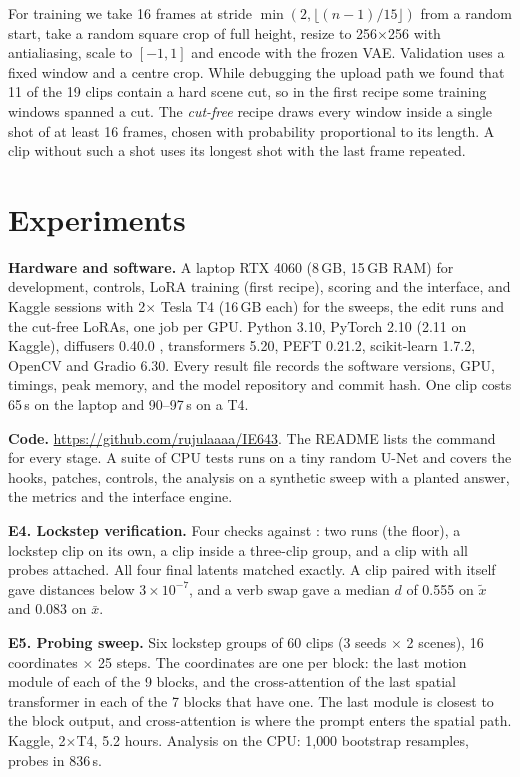 \documentclass[twoside,english]{article}
\newcommand{\xs}{\bar{x}}         %
\newcommand{\xd}{\tilde{x}}       %
\begin{document}
For training we take 16 frames at stride $\min(2, \lfloor (n-1)/15 \rfloor)$ from a random start, take a
random square crop of full height, resize to 256$\times$256 with antialiasing, scale to $[-1,1]$ and encode
with the frozen VAE. Validation uses a fixed window and a centre crop. While debugging the upload path we
found that 11 of the 19 clips contain a hard scene cut, so in the first recipe some training windows
spanned a cut. The \emph{cut-free} recipe draws every window inside a single shot of at least 16 frames,
chosen with probability proportional to its length. A clip without such a shot uses its longest shot with
the last frame repeated.

\section{Experiments} \label{sec:exp}

\textbf{Hardware and software.} A laptop RTX 4060 (8\,GB, 15\,GB RAM) for development, controls, LoRA
training (first recipe), scoring and the interface, and Kaggle sessions with 2$\times$ Tesla T4 (16\,GB
each) for the sweeps, the edit runs and the cut-free LoRAs, one job per GPU. Python 3.10, PyTorch 2.10
(2.11 on Kaggle), diffusers 0.40.0 \citep{hf_diffusers}, transformers 5.20, PEFT 0.21.2, scikit-learn
1.7.2, OpenCV and Gradio 6.30. Every result file records the software versions, GPU, timings, peak
memory, and the model repository and commit hash. One clip costs 65\,s on the laptop and 90--97\,s on a T4.

\textbf{Code.} \url{https://github.com/rujulaaaa/IE643}. The README lists the command for every stage. A
suite of CPU tests runs on a tiny random U-Net and covers the hooks, patches, controls, the analysis on a
synthetic sweep with a planted answer, the metrics and the interface engine.

\textbf{E4. Lockstep verification.} Four checks against : two  runs (the floor),
a lockstep clip on its own, a clip inside a three-clip group, and a clip with all probes attached. All
four final latents matched exactly. A clip paired with itself gave distances below $3\times10^{-7}$,
and a verb swap gave a median $d$ of 0.555 on $\xd$ and 0.083 on $\xs$.

\textbf{E5. Probing sweep.} Six lockstep groups of 60 clips (3 seeds $\times$ 2 scenes), 16 coordinates
$\times$ 25 steps. The coordinates are one per block: the last motion module of each of the 9 blocks, and
the cross-attention of the last spatial transformer in each of the 7 blocks that have one. The last
module is closest to the block output, and cross-attention is where the prompt enters the spatial path.
Kaggle, 2$\times$T4, 5.2 hours. Analysis on the CPU: 1{,}000 bootstrap resamples, probes in 836\,s.
\end{document}
